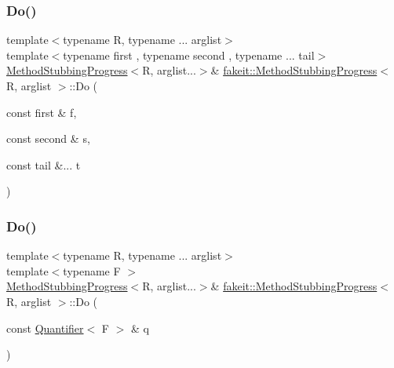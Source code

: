 \mbox{\label{structfakeit_1_1MethodStubbingProgress_a157561400e37da65c5b48f4466fc603c}} 
\subsubsection{\texorpdfstring{Do()}{Do()}\hspace{0.1cm}{\footnotesize\ttfamily [17/27]}}
{\footnotesize\ttfamily template$<$typename R, typename ... arglist$>$ \\
template$<$typename first , typename second , typename ... tail$>$ \\
\mbox{\hyperlink{structfakeit_1_1MethodStubbingProgress}{Method\+Stubbing\+Progress}}$<$R, arglist...$>$\& \mbox{\hyperlink{structfakeit_1_1MethodStubbingProgress}{fakeit\+::\+Method\+Stubbing\+Progress}}$<$ R, arglist $>$\+::Do (\begin{DoxyParamCaption}\item[{const first \&}]{f,  }\item[{const second \&}]{s,  }\item[{const tail \&...}]{t }\end{DoxyParamCaption})\hspace{0.3cm}{\ttfamily [inline]}}

\mbox{\label{structfakeit_1_1MethodStubbingProgress_a59f9d7ab7c86b809ce25b41d05b58ad2}} 
\subsubsection{\texorpdfstring{Do()}{Do()}\hspace{0.1cm}{\footnotesize\ttfamily [18/27]}}
{\footnotesize\ttfamily template$<$typename R, typename ... arglist$>$ \\
template$<$typename F $>$ \\
\mbox{\hyperlink{structfakeit_1_1MethodStubbingProgress}{Method\+Stubbing\+Progress}}$<$R, arglist...$>$\& \mbox{\hyperlink{structfakeit_1_1MethodStubbingProgress}{fakeit\+::\+Method\+Stubbing\+Progress}}$<$ R, arglist $>$\+::Do (\begin{DoxyParamCaption}\item[{const \mbox{\hyperlink{structfakeit_1_1Quantifier}{Quantifier}}$<$ F $>$ \&}]{q }\end{DoxyParamCaption})\hspace{0.3cm}{\ttfamily [inline]}}

